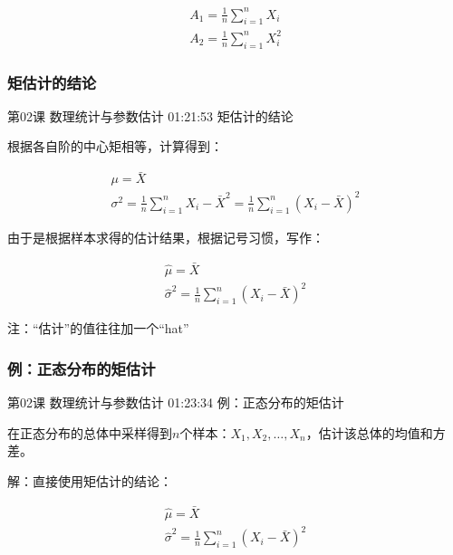 \documentclass[UTF8]{ctexart}
\begin{document}
\begin{equation}
\begin{aligned}
A_{1}=\frac{1}{n} \sum_{i=1}^{n}X_{i}\\
A_{2}=\frac{1}{n} \sum_{i=1}^{n}X_{i}^{2}
\end{aligned}
\end{equation}

\subsubsection{矩估计的结论}

第02课 数理统计与参数估计 01:21:53 矩估计的结论

根据各自阶的中心矩相等，计算得到：

\begin{equation}
\begin{aligned}
\mu=\bar{X} \\
\sigma^{2}=\frac{1}{n}\sum_{i=1}^{n}{X_{i}-\bar{X}^{2}}=\frac{1}{n}\sum_{i=1}^{n}(X_{i}-\bar{X})^{2}
\end{aligned}
\end{equation}

由于是根据样本求得的估计结果，根据记号习惯，写作：

\begin{equation}
\begin{aligned}
\hat{\mu}=\bar{X} \\
\hat{\sigma}^{2}=\frac{1}{n}\sum_{i=1}^{n}(X_{i}-\bar{X})^{2}
\end{aligned}
\end{equation}

注：“估计”的值往往加一个“hat”

\subsubsection{例：正态分布的矩估计}

第02课 数理统计与参数估计 01:23:34 例：正态分布的矩估计

在正态分布的总体中采样得到$n$个样本：$X_ {1},X_{2},\dots,X_{n}$，估计该总体的均值和方差。

解：直接使用矩估计的结论：

\begin{equation}
\begin{aligned}
\hat{\mu}=\bar{X} \\
\hat{\sigma}^{2}=\frac{1}{n}\sum_{i=1}^{n}(X_{i}-\bar{X})^{2}
\end{aligned}
\end{equation}
\end{document}
